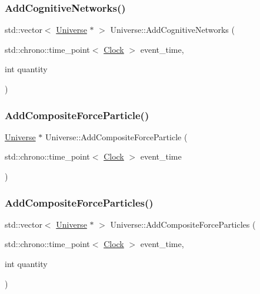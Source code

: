 \mbox{\label{classUniverse_a5199f6c27b1a97c8b8c9847b8be686cf}} 
\subsubsection{\texorpdfstring{Add\+Cognitive\+Networks()}{AddCognitiveNetworks()}}
{\footnotesize\ttfamily std\+::vector$<$ \mbox{\hyperlink{classUniverse}{Universe}} $\ast$ $>$ Universe\+::\+Add\+Cognitive\+Networks (\begin{DoxyParamCaption}\item[{std\+::chrono\+::time\+\_\+point$<$ \mbox{\hyperlink{universe_8h_a0ef8d951d1ca5ab3cfaf7ab4c7a6fd80}{Clock}} $>$}]{event\+\_\+time,  }\item[{int}]{quantity }\end{DoxyParamCaption})}

\mbox{\label{classUniverse_ab2671c2218c98f0f1f487c5b3bb96e3c}} 
\subsubsection{\texorpdfstring{Add\+Composite\+Force\+Particle()}{AddCompositeForceParticle()}}
{\footnotesize\ttfamily \mbox{\hyperlink{classUniverse}{Universe}} $\ast$ Universe\+::\+Add\+Composite\+Force\+Particle (\begin{DoxyParamCaption}\item[{std\+::chrono\+::time\+\_\+point$<$ \mbox{\hyperlink{universe_8h_a0ef8d951d1ca5ab3cfaf7ab4c7a6fd80}{Clock}} $>$}]{event\+\_\+time }\end{DoxyParamCaption})}

\mbox{\label{classUniverse_a23d74e377203fca7cb74e0ffee7244b6}} 
\subsubsection{\texorpdfstring{Add\+Composite\+Force\+Particles()}{AddCompositeForceParticles()}}
{\footnotesize\ttfamily std\+::vector$<$ \mbox{\hyperlink{classUniverse}{Universe}} $\ast$ $>$ Universe\+::\+Add\+Composite\+Force\+Particles (\begin{DoxyParamCaption}\item[{std\+::chrono\+::time\+\_\+point$<$ \mbox{\hyperlink{universe_8h_a0ef8d951d1ca5ab3cfaf7ab4c7a6fd80}{Clock}} $>$}]{event\+\_\+time,  }\item[{int}]{quantity }\end{DoxyParamCaption})}

